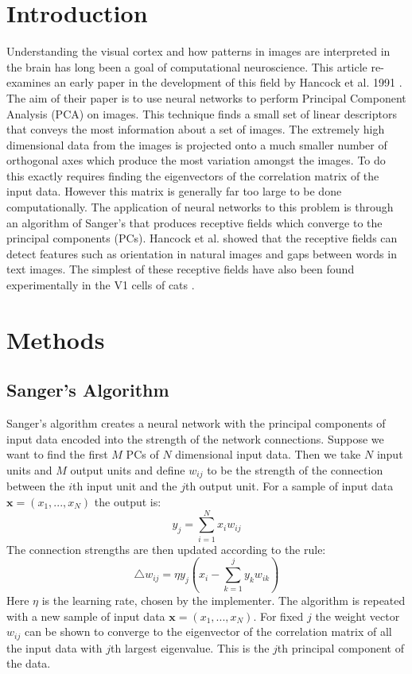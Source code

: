 \usepackage{graphicx}
\graphicspath{ {./figures/} }

\section{Introduction}

Understanding the visual cortex and how patterns in images are interpreted in the brain has long been a goal of computational neuroscience. This article re-examines an early paper in the development of this field by Hancock et al. 1991 \cite{Hancock:1991}. 
The aim of their paper is to use neural networks to perform Principal Component Analysis (PCA) on images. This technique finds a small set of linear descriptors that conveys the most information about a set of images. The extremely high dimensional data from the images is projected onto a much smaller number of orthogonal axes which produce the most variation amongst the images. To do this exactly requires finding the eigenvectors of the correlation matrix of the input data. However this matrix is generally far too large to be done computationally. The application of neural networks to this problem is through an algorithm of Sanger's that produces receptive fields which converge to the principal components (PCs).
Hancock et al. showed that the receptive fields can detect features such as orientation in natural images and gaps between words in text images. The simplest of these receptive fields have also been found experimentally in the V1 cells of cats \cite{Orban:1984}.

\section{Methods}

\subsection{Sanger's Algorithm}

Sanger's algorithm \cite{Sanger:1989} creates a neural network with the principal components of input data encoded into the strength of the network connections. Suppose we want to find the first $M$ PCs of $N$ dimensional input data. Then we take $N$ input units and $M$ output units and define $w_{ij}$ to be the strength of the connection between the $i$th input unit and the $j$th output unit. For a sample of input data $\textbf{x}=(x_1,...,x_N)$ the output is:
\[y_j=\sum^N_{i=1}x_iw_{ij}\]
The connection strengths are then updated according to the rule:
\[\triangle w_{ij}=\eta y_j(x_i-\sum^j_{k=1}y_k w_{ik})\]
Here $\eta$ is the learning rate, chosen by the implementer. The algorithm is repeated with a new sample of input data $\textbf{x}=(x_1,...,x_N)$. For fixed $j$ the weight vector $w_{ij}$ can be shown to converge to the eigenvector of the correlation matrix of all the input data with $j$th largest eigenvalue. This is the $j$th principal component of the data.

